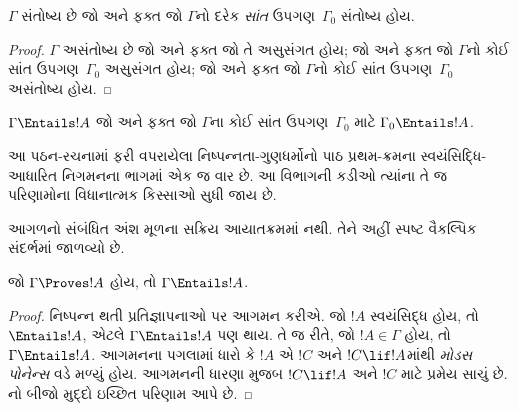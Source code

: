 \begin{prop}[સઘનતા પ્રમેય]
$\Gamma$ સંતોષ્ય છે જો અને ફક્ત જો $\Gamma$નો દરેક
\emph{સાંત} ઉપગણ~$\Gamma_0$ સંતોષ્ય હોય.
\end{prop}

\begin{proof}
$\Gamma$ અસંતોષ્ય છે જો અને ફક્ત જો તે અસુસંગત હોય;
જો અને ફક્ત જો $\Gamma$નો કોઈ સાંત ઉપગણ~$\Gamma_0$
અસુસંગત હોય; જો અને ફક્ત જો $\Gamma$નો કોઈ સાંત
ઉપગણ~$\Gamma_0$ અસંતોષ્ય હોય.
\end{proof}

\begin{cor}
$\Gamma \Entails !A$ જો અને ફક્ત જો $\Gamma$ના
કોઈ સાંત ઉપગણ~$\Gamma_0$ માટે $\Gamma_0 \Entails !A$.
\end{cor}

\begin{editorial}
આ પઠન-રચનામાં ફરી વપરાયેલા નિષ્પન્નતા-ગુણધર્મોનો પાઠ પ્રથમ-ક્રમના સ્વયંસિદ્ધિ-આધારિત નિગમનના ભાગમાં એક જ વાર છે. આ વિભાગની કડીઓ ત્યાંના તે જ પરિણામોના વિધાનાત્મક કિસ્સાઓ સુધી જાય છે.
\end{editorial}
\endgroup

\begin{editorial}
આગળનો સંબંધિત અંશ મૂળના સક્રિય આયાતક્રમમાં નથી. તેને અહીં સ્પષ્ટ વૈકલ્પિક સંદર્ભમાં જાળવ્યો છે.
\end{editorial}
\begingroup
\makeatletter{}\makeatother


\label{guunit:OLP-0715}


\begin{thm}[યથાર્થતા]
જો $\Gamma\Proves!A$ હોય, તો $\Gamma \Entails !A$.
\end{thm}

\begin{proof}
નિષ્પન્ન થતી પ્રતિજ્ઞાપનાઓ પર આગમન કરીએ.
જો $!A$ સ્વયંસિદ્ધ હોય, તો $\Entails
!A$, એટલે $\Gamma \Entails!A$ પણ થાય.
તે જ રીતે, જો $!A \in \Gamma$ હોય, તો $\Gamma \Entails!A$.
આગમનના પગલામાં ધારો કે $!A$ એ $!C$ અને $!C\lif!A$માંથી
\emph{મોડસ પોનેન્સ} વડે મળ્યું હોય.
આગમનની ધારણા મુજબ $!C\lif !A$ અને $!C$ માટે પ્રમેય સાચું છે.
નો બીજો મુદ્દો
ઇચ્છિત પરિણામ આપે છે.
\end{proof}


